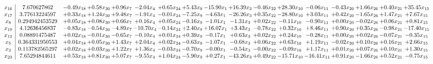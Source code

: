 \documentclass[9pt]{article}
\begin{document}
 \[\begin{array}{c| c c@{\hskip 2pt} c@{\hskip 2pt} c@{\hskip 2pt} c@{\hskip 2pt} c@{\hskip 2pt} c@{\hskip 2pt} c@{\hskip 2pt} c@{\hskip 2pt} c@{\hskip 2pt} c@{\hskip 2pt} c@{\hskip 2pt} c@{\hskip 2pt} c@{\hskip 2pt} c@{\hskip 2pt} c@{\hskip 2pt} }
 x_{16}   &  7.670627862 & -0.49 x_{18} & +  0.58 x_{30} & +  0.96 x_{7} & -2.04 x_{4} & +  0.65 x_{24} & +  5.43 x_{9} & -15.90 x_{1} & + 16.39 x_{3} & -0.46 x_{22} & + 28.30 x_{10} & -0.06 x_{11} & -0.43 x_{20} & +  1.66 x_{26} & +  0.40 x_{21} & + 35.45 x_{15}\\
 x_{17}   &  3.77613224597 & +  0.33 x_{18} & +  1.24 x_{30} & +  9.48 x_{7} & -1.91 x_{4} & -0.01 x_{24} & -7.25 x_{9} & -4.63 x_{1} & -26.26 x_{3} & +  0.35 x_{22} & -28.80 x_{10} & +  3.03 x_{11} & +  0.42 x_{20} & -1.65 x_{26} & +  1.47 x_{21} & +  7.67 x_{15}\\
 x_{8}   &  0.294942453529 & +  0.05 x_{18} & +  0.08 x_{30} & +  0.66 x_{7} & +  0.16 x_{4} & +  0.05 x_{24} & -0.16 x_{9} & -1.01 x_{1} & -1.31 x_{3} & +  0.02 x_{22} & -0.11 x_{10} & -0.90 x_{11} & +  0.00 x_{20} & -0.02 x_{26} & +  0.06 x_{21} & +  0.81 x_{15}\\
 x_{19}   &  4.12636456837 & -0.83 x_{18} & -0.54 x_{30} & -4.89 x_{7} & -10.70 x_{4} & -0.14 x_{24} & +  2.40 x_{9} & + 16.07 x_{1} & +  3.43 x_{3} & -0.78 x_{22} & +  0.32 x_{10} & +  8.46 x_{11} & +  0.90 x_{20} & +  0.35 x_{26} & -0.98 x_{21} & -17.40 x_{15}\\
 x_{12}   &  0.08891475487 & +  0.02 x_{18} & -0.01 x_{30} & -0.65 x_{7} & -0.10 x_{4} & +  0.01 x_{24} & +  0.39 x_{9} & -0.17 x_{1} & +  0.63 x_{3} & +  0.02 x_{22} & +  0.24 x_{10} & -0.28 x_{11} & +  0.00 x_{20} & +  0.02 x_{26} & -0.07 x_{21} & -0.35 x_{15}\\
 x_{5}   &  0.364331950553 & +  0.04 x_{18} & +  0.05 x_{30} & +  1.43 x_{7} & +  2.04 x_{4} & +  0.02 x_{24} & -0.63 x_{9} & -1.07 x_{1} & -0.68 x_{3} & +  0.06 x_{22} & +  0.63 x_{10} & +  1.19 x_{11} & -0.02 x_{20} & +  0.10 x_{26} & +  0.16 x_{21} & +  2.66 x_{15}\\
 x_{2}   &  0.113782565297 & +  0.02 x_{18} & +  0.03 x_{30} & +  1.22 x_{7} & +  1.36 x_{4} & -0.03 x_{24} & -0.70 x_{9} & -0.00 x_{1} & -0.54 x_{3} & -0.00 x_{22} & -0.09 x_{10} & +  1.17 x_{11} & +  0.01 x_{20} & +  0.07 x_{26} & +  0.10 x_{21} & +  1.30 x_{15}\\
 x_{23}   &  7.65294844611 & +  0.53 x_{18} & +  0.81 x_{30} & +  5.07 x_{7} & -9.55 x_{4} & +  1.04 x_{24} & -5.90 x_{9} & +  0.27 x_{1} & -43.26 x_{3} & +  0.49 x_{22} & -15.71 x_{10} & -16.41 x_{11} & +  0.91 x_{20} & -1.66 x_{26} & +  0.52 x_{21} & -0.75 x_{15}\\

\end{array}\]
\end{document}

